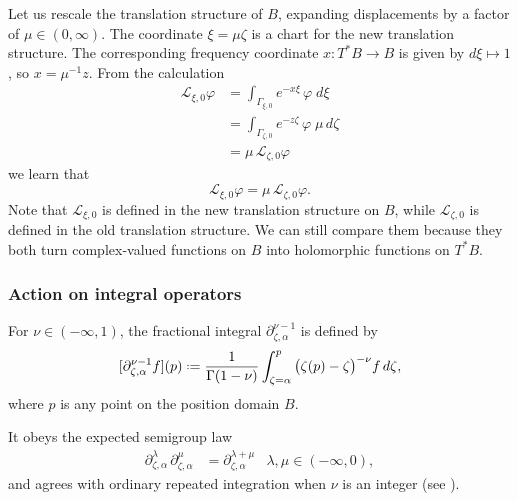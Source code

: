 \documentclass{article}
\theoremstyle{definition}
\newcommand{\maps}{\colon}
\newcommand{\fracderiv}[3]{\partial^{#1}_{#2, #3}}
\newcommand*{\defeq}{\mathrel{\vcenter{\baselineskip0.5ex \lineskiplimit0pt
                     \hbox{\scriptsize.}\hbox{\scriptsize.}}}%
                     =}
\newcommand{\laplace}{\mathcal{L}}
\begin{document}
Let us rescale the translation structure of $B$, expanding displacements by a factor of $\mu \in (0, \infty)$. The coordinate $\xi = \mu\zeta$ is a chart for the new translation structure. The corresponding frequency coordinate $x \maps T^*B \to B$ is given by $d\xi \mapsto 1$, so $x = \mu^{-1} z$. From the calculation
\begin{align*}
\laplace_{\xi, 0} \varphi & = \int_{\Gamma_{\xi, 0}} e^{-x\xi}\,\varphi\;d\xi \\
& = \int_{\Gamma_{\zeta, 0}} e^{-z \zeta}\,\varphi\;\mu\,d\zeta \\
& = \mu\,\laplace_{\zeta, 0} \varphi
\end{align*}
we learn that
\[ \laplace_{\xi, 0} \varphi = \mu\,\laplace_{\zeta, 0} \varphi. \]
Note that $\laplace_{\xi, 0}$ is defined in the new translation structure on $B$, while $\laplace_{\zeta, 0}$ is defined in the old translation structure. We can still compare them because they both turn complex-valued functions on $B$ into holomorphic functions on $T^*B$.

\subsubsection{Action on integral operators}\label{L-int-op}
For $\nu \in (-\infty, 1)$, the fractional integral $\partial^{\nu-1}_{\zeta, \alpha}$ is defined by
\[ [\partial^{\nu-1}_{\zeta, \alpha} f](p) \defeq \frac{1}{\Gamma(1-\nu)} \int_{\zeta = \alpha}^p \big(\zeta(p)-\zeta\big)^{-\nu} f\,d\zeta, \]
where $p$ is any point on the position domain $B$. 

It obeys the expected semigroup law \cite[Section  1.3]{mladenov2014advanced}
\begin{align*}
\fracderiv{\lambda}{\zeta}{\alpha}\,\fracderiv{\mu}{\zeta}{\alpha} & = \fracderiv{\lambda+\mu}{\zeta}{\alpha} & \lambda, \mu \in (-\infty, 0),
\end{align*}
and agrees with ordinary repeated integration when $\nu$ is an integer (see \cite[Equation 35]{mladenov2014advanced}).
\end{document}
